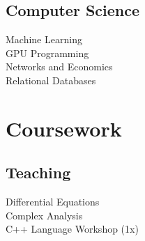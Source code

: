 \documentclass[]{yubo-resume-openfont}
\begin{document}
\begin{minipage}[t]{0.33\textwidth}
{    \subsection{Computer Science}
        Machine Learning\\
        GPU Programming\\
        Networks and Economics\\
        Relational Databases
}

\section{Coursework}
    \ifisCS
        \PhWork
        \sectionsep
        \CSWork
    \else
        \CSWork
        \sectionsep
        \PhWork
    \fi
    \sectionsep

    \subsection{Teaching}
        Differential Equations\\
        Complex Analysis\\
        C++ Language Workshop (1x)
    \sectionsep

%
%

\end{minipage}
\hfill
\end{document}
